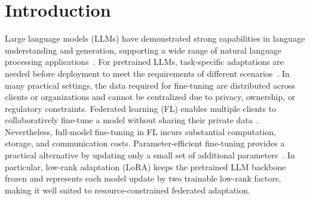 \documentclass[lettersize,journal]{IEEEtran}
\begin{document}
\begin{abstract}
		With this insight, we propose Federated Adaptive Factor Sharing Low-Rank Adaptation (FedAS-LoRA), which selects the sharing side before training to enhance fine-tuning performance. 
		To enable adaptive factor selection before training, we design a Rank-Aware Shared-Subspace Sufficiency (RSS) metric, which effectively assesses whether a shared rank-$r$ input subspace is sufficient for the local data distributions using representations extracted from a frozen LLM backbone. 
		Experiments across different tasks, data distributions, LoRA ranks, and participation settings confirm the effectiveness of RSS and the superior performance of FedAS-LoRA.
	\end{abstract}
	
	
	
	\section{Introduction}
	Large language models (LLMs) have demonstrated strong capabilities in language understanding and generation, supporting a wide range of natural language processing applications~\cite{brown2020language,touvron2023llama}. For pretrained LLMs, task-specific adaptations are needed before deployment to meet the requirements of different scenarios~\cite{houlsby2019parameter,li2021prefix,hu2022lora}. In many practical settings, the data required for fine-tuning are distributed across clients or organizations and cannot be centralized due to privacy, ownership, or regulatory constraints. Federated learning (FL) enables multiple clients to collaboratively 
	fine-tune a model without sharing their private data~\cite{mcmahan2017communication,li2020federated}. Nevertheless, full-model fine-tuning in FL incurs substantial computation, storage, and communication costs. Parameter-efficient fine-tuning provides a practical alternative by updating only a small set of additional parameters~\cite{he2022towards}. In particular, low-rank adaptation (LoRA) keeps the pretrained LLM backbone frozen and represents each model update by two trainable low-rank factors, making it well suited to resource-constrained federated adaptation.
	
\end{document}
